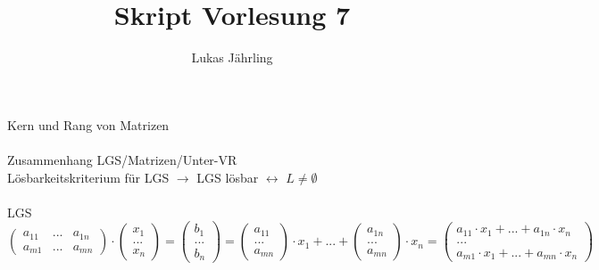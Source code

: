\documentclass{scrartcl}
\title{Skript Vorlesung 7}
\author{Lukas Jährling}
\begin{document}
	\large
	Kern und Rang von Matrizen
	\normalsize
	\\\\
	Zusammenhang LGS/Matrizen/Unter-VR\\
	Lösbarkeitskriterium für LGS $\rightarrow$ LGS lösbar $\leftrightarrow$ $L \not = \emptyset$
	\\\\
	LGS$ \begin{pmatrix}
	a_{11} & ... & a_{1n} \\ a_{m1} & ... & a_{mn}
	\end{pmatrix}
	\cdot \begin{pmatrix}
	x_1 \\ ... \\ x_n
	\end{pmatrix} = \begin{pmatrix}
	b_1 \\ ... \\ b_n
	
	\end{pmatrix} = \begin{pmatrix}
		a_{11} \\ ... \\ a_{mn}
	\end{pmatrix} \cdot x_1 + ... + \begin{pmatrix}
		a_{1n} \\ ... \\ a_{mn}
	\end{pmatrix} \cdot x_n = \begin{pmatrix}
		a_{11} \cdot x_1 + ... + a_{1n} \cdot x_n \\ ... \\ a_{m1} \cdot x_1 + ... + a_{mn} \cdot x_n
	\end{pmatrix}$
	
\end{document}
